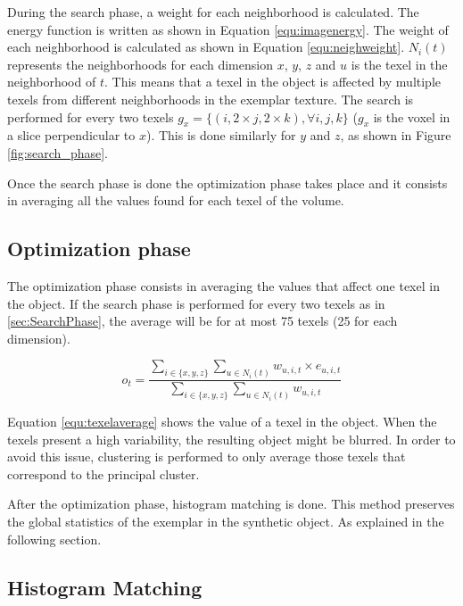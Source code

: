 During the search phase, a weight for each neighborhood is calculated. 
The energy function is written as shown in Equation \ref{equ:imagenergy}.
The weight of each neighborhood is calculated as shown in Equation \ref{equ:neighweight}. 
$N_i(t)$ represents the neighborhoods for each dimension $x$, $y$, $z$ 
and $u$ is the texel in the neighborhood of $t$. 
This means that a texel in the object is affected by multiple texels from different neighborhoods in the exemplar texture. 
The search is performed for every two texels $g_x = \{(i, 2 \times j, 2 \times k), \forall i, j, k \}$ 
($g_x$ is the voxel in a slice perpendicular to $x$). 
This is done similarly for $y$ and $z$, as shown in Figure \ref{fig:search_phase}.

Once the search phase is done the optimization phase takes place and it consists in averaging 
all the values found for each texel of the volume. 

\subsection{Optimization phase}
\label{sec:OptimizationPhase}

The optimization phase consists in averaging the values that affect one texel in the object. 
If the search phase is performed for every two texels as in \ref{sec:SearchPhase}, 
the average will be for at most 75 texels (25 for each dimension).

\begin{equation}
 o_t = \frac{ \sum_{i \in \{x, y, z\}} \sum_{u \in N_i(t)} w_{u, i, t} \times e_{u, i, t} }{ \sum_{i \in \{x, y, z\}} \sum_{u \in N_i(t)} w_{u, i, t} }
 \label{equ:texelaverage}
\end{equation}

Equation \ref{equ:texelaverage} shows the value of a texel in the object. 
When the texels present a high variability, the resulting object might be
blurred. In order to avoid this issue, 
clustering is performed to only average those texels that correspond to the principal cluster.

After the optimization phase, histogram matching is done. 
This method preserves the global statistics of the exemplar in the synthetic object.
As explained in the following section.

\subsection{Histogram Matching}
\label{sec:histogramMatching}

